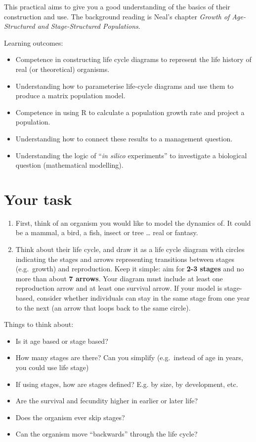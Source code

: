 \documentclass[
  a4paper]{book}
\providecommand{\tightlist}{%
  \setlength{\itemsep}{0pt}\setlength{\parskip}{0pt}}
\begin{document}
This practical aims to give you a good understanding of the basics of their construction and use. The background reading is Neal's chapter \emph{Growth of Age-Structured and Stage-Structured Populations}.

Learning outcomes:

\begin{itemize}
\tightlist
\item
  Competence in constructing life cycle diagrams to represent the life history of real (or theoretical) organisms.
\item
  Understanding how to parameterise life-cycle diagrams and use them to produce a matrix population model.
\item
  Competence in using R to calculate a population growth rate and project a population.
\item
  Understanding how to connect these results to a management question.
\item
  Understanding the logic of ``\emph{in silico} experiments'' to investigate a biological question (mathematical modelling).
\end{itemize}

\section{Your task}\label{your-task-8}

\begin{enumerate}
\def\labelenumi{\arabic{enumi})}
\item
  First, think of an organism you would like to model the dynamics of. It could be a mammal, a bird, a fish, insect or tree \ldots{} real or fantasy.
\item
  Think about their life cycle, and draw it as a life cycle diagram with circles indicating the stages and arrows representing transitions between stages (e.g.~growth) and reproduction. Keep it simple: aim for \textbf{2-3 stages} and no more than about \textbf{7 arrows}. Your diagram must include at least one reproduction arrow and at least one survival arrow. If your model is stage-based, consider whether individuals can stay in the same stage from one year to the next (an arrow that loops back to the same circle).
\end{enumerate}

Things to think about:

\begin{itemize}
\tightlist
\item
  Is it age based or stage based?
\item
  How many stages are there? Can you simplify (e.g.~instead of age in years, you could use life stage)
\item
  If using stages, how are stages defined? E.g. by size, by development, etc.
\item
  Are the survival and fecundity higher in earlier or later life?
\item
  Does the organism ever skip stages?
\item
  Can the organism move ``backwards'' through the life cycle?
\end{itemize}
\end{document}
